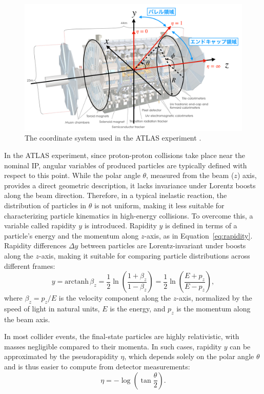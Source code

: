 \begin{figure}[htbp]
  \centering
  \includegraphics[width=1.0\textwidth]{figs/chapter2/ATLAS_coordinate.png}
  \caption{The coordinate system used in the ATLAS experiment \cite{mino}.}
  \label{fig:ATLASCoordinate}
\end{figure}

In the ATLAS experiment, since proton-proton collisions take place near the nominal IP, angular variables of produced particles are typically defined with respect to this point. While the polar angle \(\theta\), measured from the beam (\(z\)) axis, provides a direct geometric description, it lacks invariance under Lorentz boosts along the beam direction. Therefore, in a typical inelastic reaction, the distribution of particles in \(\theta\) is not uniform, making it less suitable for characterizing particle kinematics in high-energy collisions.
To overcome this, a variable called rapidity \(y\) is introduced. Rapidity \(y\) is defined in terms of a particle's energy and the momentum along \(z\)-axis, as in Equation~\ref{eq:rapidity}. Rapidity differences \(\Delta y\) between particles are Lorentz-invariant under boosts along the \(z\)-axis, making it suitable for comparing particle distributions across different frames:
\begin{equation}
  y = \mathrm{arctanh}\, \beta_z 
    = \frac{1}{2} \ln \left( \frac{1 + \beta_z}{1 - \beta_z} \right)
    = \frac{1}{2} \ln \left( \frac{E + p_z}{E - p_z} \right),
  \label{eq:rapidity}
\end{equation}
where \(\beta_z = p_z/E\) is the velocity component along the \(z\)-axis, normalized by the speed of light in natural units, \(E\) is the energy, and \(p_z\) is the momentum along the beam axis.

In most collider events, the final-state particles are highly relativistic, with masses negligible compared to their momenta. In such cases, rapidity \(y\) can be approximated by the pseudorapidity \(\eta\), which depends solely on the polar angle \(\theta\) and is thus easier to compute from detector measurements:
\begin{equation}
  \eta = -\log\left( \tan \frac{\theta}{2} \right).
  \label{eq:pseudorapidity}
\end{equation}

